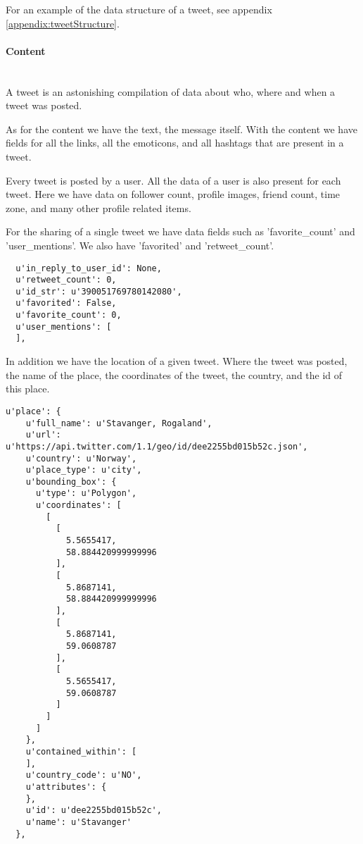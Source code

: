 For an example of the data structure of a tweet, see appendix
\ref{appendix:tweetStructure}.

\paragraph{Content}
\hspace{0pt}\\

A tweet is an astonishing compilation of data about who, where and when a tweet
was posted.

As for the content we have the text, the message itself. With the content we
have fields for all the links, all the emoticons, and all hashtags that are
present in a tweet. 

Every tweet is posted by a user. All the data of a user is also present for
each tweet. Here we have data on follower count, profile images, friend count,
time zone, and many other profile related items. 

For the sharing of a single tweet we have data fields such as 'favorite\_count'
and 'user\_mentions'. We also have 'favorited' and 'retweet\_count'. 

\begin{verbatim}
  u'in_reply_to_user_id': None,
  u'retweet_count': 0,
  u'id_str': u'390051769780142080',
  u'favorited': False,
  u'favorite_count': 0,
  u'user_mentions': [      
  ],
\end{verbatim}

In addition we have the location of a given tweet. Where the tweet was posted,
the name of the place, the coordinates of the tweet, the country, and the id of
this place. 

\begin{verbatim}
u'place': {
    u'full_name': u'Stavanger, Rogaland',
    u'url': u'https://api.twitter.com/1.1/geo/id/dee2255bd015b52c.json',
    u'country': u'Norway',
    u'place_type': u'city',
    u'bounding_box': {
      u'type': u'Polygon',
      u'coordinates': [
        [
          [
            5.5655417,
            58.884420999999996
          ],
          [
            5.8687141,
            58.884420999999996
          ],
          [
            5.8687141,
            59.0608787
          ],
          [
            5.5655417,
            59.0608787
          ]
        ]
      ]
    },
    u'contained_within': [
    ],
    u'country_code': u'NO',
    u'attributes': {
    },
    u'id': u'dee2255bd015b52c',
    u'name': u'Stavanger'
  },
\end{verbatim}

